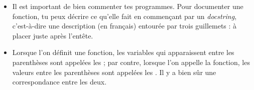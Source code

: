 \documentclass[11pt,class=report,crop=false]{standalone}
\begin{document}
\begin{cours}
\begin{itemize}
  \item Il est important de bien commenter tes programmes. Pour documenter une fonction, tu peux décrire ce qu'elle fait en commençant par un \emph{docstring}, c'est-à-dire une description (en français) entourée par trois guillemets :  à placer juste après l'entête.

  
  \item Lorsque l'on définit une fonction, les variables qui apparaissent entre les parenthèses sont appelées les  ; par contre, lorsque l'on appelle la fonction, les valeurs entre les parenthèses sont appelées les . Il y a bien sûr une correspondance entre les deux.

  

\end{itemize}
\end{cours}


\end{document}
